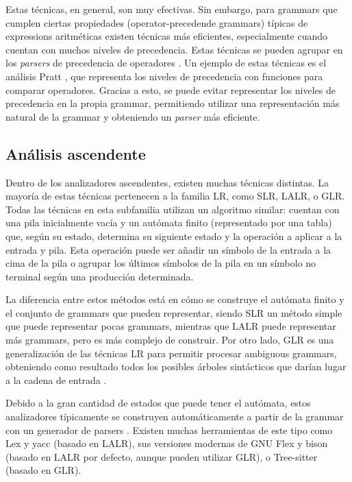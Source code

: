 Estas técnicas, en general, son muy efectivas. Sin embargo, para \glspl{grammar}
que cumplen ciertas propiedades (\glspl{operator-precedende grammar}) típicas de
\glspl{expression} aritméticas existen técnicas más eficientes, especialmente
cuando cuentan con muchos niveles de precedencia. Estas técnicas se pueden
agrupar en los \textit{\glspl{parser}} de precedencia de operadores
\parencite{operator-precedence-parser}. Un ejemplo de estas técnicas es el
análisis Pratt \parencite{pratt-parsing-paper}
\parencite{pratt-parsing-example}, que representa los niveles de precedencia con
funciones para comparar operadores. Gracias a esto, se puede evitar representar
los niveles de precedencia en la propia \gls{grammar}, permitiendo utilizar una
representación más natural de la \gls{grammar} y obteniendo un
\textit{\gls{parser}} más eficiente.

\subsection{Análisis ascendente}

Dentro de los analizadores ascendentes, existen muchas técnicas distintas. La
mayoría de estas técnicas pertenecen a la familia LR, como SLR, LALR, o GLR.
Todas las técnicas en esta subfamilia utilizan un algoritmo similar: cuentan con
una pila inicialmente vacía y un autómata finito (representado por una tabla)
que, según su estado, determina su siguiente estado y la operación a aplicar a
la entrada y pila. Esta operación puede ser añadir un símbolo de la entrada a la
cima de la pila o agrupar los últimos símbolos de la pila en un símbolo no
terminal según una producción determinada. \parencite{dragon-book} 

La diferencia entre estos métodos está en cómo se construye el autómata finito y
el conjunto de \glspl{grammar} que pueden representar, siendo SLR un método
simple que puede representar pocas \glspl{grammar}, mientras que LALR puede
representar más \glspl{grammar}, pero es más complejo de construir.
\parencite{dragon-book} Por otro lado, GLR es una generalización de las técnicas
LR para permitir procesar \glspl{ambiguous grammar}, obteniendo como resultado
todos los posibles árboles sintácticos que darían lugar a la cadena de entrada
\parencite{GLR-algorithm}.

Debido a la gran cantidad de estados que puede tener el autómata, estos
analizadores típicamente se construyen automáticamente a partir de la
\gls{grammar} con un generador de \glspl{parser} \parencite{dragon-book}.
Existen muchas herramientas de este tipo como Lex y yacc \parencite{yacc}
(basado en LALR), sus versiones modernas de GNU Flex y bison \parencite{bison}
(basado en LALR por defecto, aunque pueden utilizar GLR), o Tree-sitter
\parencite{tree-sitter} (basado en GLR).


